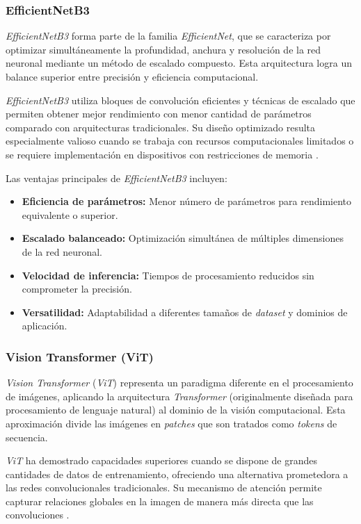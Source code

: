 \subsubsection{EfficientNetB3}

\textit{EfficientNetB3} forma parte de la familia \textit{EfficientNet}, que se caracteriza por optimizar simultáneamente la profundidad, anchura y resolución de la red neuronal mediante un método de escalado compuesto. Esta arquitectura logra un balance superior entre precisión y eficiencia computacional.

\textit{EfficientNetB3} utiliza bloques de convolución eficientes y técnicas de escalado que permiten obtener mejor rendimiento con menor cantidad de parámetros comparado con arquitecturas tradicionales. Su diseño optimizado resulta especialmente valioso cuando se trabaja con recursos computacionales limitados o se requiere implementación en dispositivos con restricciones de memoria \cite{Tan2019EfficientNet}.

Las ventajas principales de \textit{EfficientNetB3} incluyen:

\begin{itemize}
    \item \textbf{Eficiencia de parámetros:} Menor número de parámetros para rendimiento equivalente o superior.
    \item \textbf{Escalado balanceado:} Optimización simultánea de múltiples dimensiones de la red neuronal.
    \item \textbf{Velocidad de inferencia:} Tiempos de procesamiento reducidos sin comprometer la precisión.
    \item \textbf{Versatilidad:} Adaptabilidad a diferentes tamaños de \textit{dataset} y dominios de aplicación.
\end{itemize}

\subsubsection{Vision Transformer (ViT)}

\textit{Vision Transformer} (\textit{ViT}) representa un paradigma diferente en el procesamiento de imágenes, aplicando la arquitectura \textit{Transformer} (originalmente diseñada para procesamiento de lenguaje natural) al dominio de la visión computacional. Esta aproximación divide las imágenes en \textit{patches} que son tratados como \textit{tokens} de secuencia.

\textit{ViT} ha demostrado capacidades superiores cuando se dispone de grandes cantidades de datos de entrenamiento, ofreciendo una alternativa prometedora a las redes convolucionales tradicionales. Su mecanismo de atención permite capturar relaciones globales en la imagen de manera más directa que las convoluciones \cite{Dosovitskiy2020Image}.

